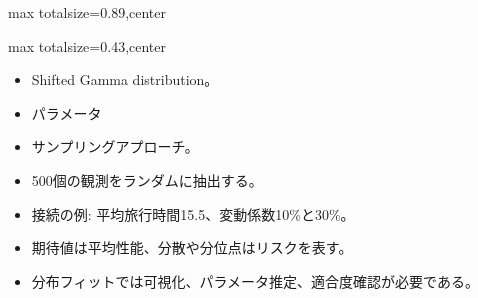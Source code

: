 \begin{minipage}[t]{0.58\textwidth}
\begin{adjustbox}{max totalsize={\textwidth}{0.89\textheight},center}
\begin{minipage}{\textwidth}
\end{minipage}
\end{adjustbox}
\end{minipage}


\clearpage
{}
\begin{minipage}[t]{0.405\textwidth}
\begin{adjustbox}{max totalsize={\textwidth}{0.43\textheight},center}
\begin{minipage}{\textwidth}\scriptsize
{}\begin{itemize}
\item Shifted Gamma distribution。
\item パラメータ
\item サンプリングアプローチ。
\item 500個の観測をランダムに抽出する。
\item 接続の例: 平均旅行時間15.5、変動係数10\%と30\%。
\end{itemize}\begin{itemize}
\item 期待値は平均性能、分散や分位点はリスクを表す。
\item 分布フィットでは可視化、パラメータ推定、適合度確認が必要である。
\end{itemize}
\end{minipage}
\end{adjustbox}
\end{minipage}\hfill
